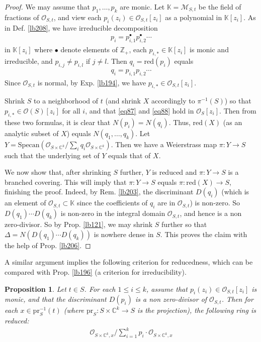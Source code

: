 \documentclass[12pt,b5paper,notitlepage]{report}
\theoremstyle{definition}
\theoremstyle{plain}
\newtheorem{pp}[df]{Proposition}
\newcommand{\scr}{\mathscr}
\newcommand{\blt}{\bullet}
\newcommand{\Kbb}{\mathbb K}
\newcommand{\Cbb}{\mathbb C}
\newcommand{\Zbb}{\mathbb Z}
\newcommand{\pr}{\mathrm {pr}}
\newcommand{\Specan}{\mathrm{Specan}}
\newcommand{\red}{\mathrm{red}}
\numberwithin{equation}{section}
\begin{document}
\begin{proof}
We may assume that $p_1,\dots,p_k$ are monic. Let $\Kbb=\scr M_{S,t}$ be the field of fractions of $\scr O_{S,t}$, and view each $p_i(z_i)\in\scr O_{S,t}[z_i]$ as a polynomial in $\Kbb[z_i]$. As in Def. \ref{lb208}, we have irreducible decomposition
\begin{align}
p_i=p_{i,1}^\blt p_{i,2}^\blt\cdots\label{eq87}
\end{align}
in $\Kbb[z_i]$ where $\blt$ denote elements of $\Zbb_+$, each $p_{i,*}\in\Kbb[z_i]$ is monic and irreducible, and $p_{i,j}\neq p_{i,l}$ if $j\neq l$. Then $q_i=\red(p_i)$ equals
\begin{align}
q_i=p_{i,1}p_{i,2}\cdots\label{eq88}
\end{align}
Since $\scr O_{S,t}$ is normal, by Exp. \ref{lb194}, we have $p_{i,*}\in\scr O_{S,t}[z_i]$. 

Shrink $S$ to a neighborhood of $t$ (and shrink $X$ accordingly to $\pi^{-1}(S)$) so that $p_{i,*}\in\scr O(S)[z_i]$ for all $i$, and that \eqref{eq87} and \eqref{eq88} hold in $\scr O_S[z_i]$. Then from these two formulas, it is clear that $N(p_i)=N(q_i)$. Thus, $\red(X)$ (as an analytic subset of $X$) equals $N(q_1,\dots,q_k)$. Let $Y=\Specan(\scr O_{S\times\Cbb^k}/\sum_i q_i\scr O_{S\times\Cbb^k})$. Then we have a Weierstrass map $\pi:Y\rightarrow S$ such that the underlying set of $Y$ equals that of $X$.

We now show that, after shrinking $S$ further, $Y$ is reduced and $\pi:Y\rightarrow S$ is a branched covering. This will imply that $\pi:Y\rightarrow S$ equals $\pi:\red(X)\rightarrow S$, finishing the proof. Indeed, by Rem. \ref{lb203}, the discriminant $D(q_i)$ (which is an element of $\scr O_{S,t}\subset\Kbb$ since the coefficients of $q_i$ are in $\scr O_{S,t}$) is non-zero. So $D(q_1)\cdots D(q_k)$ is non-zero in the integral domain $\scr O_{S,t}$, and hence is a non zero-divisor. So by Prop. \ref{lb121}, we may shrink $S$ further so that $\Delta=N(D(q_1)\cdots D(q_k))$ is nowhere dense in $S$. This proves the claim with the help of Prop. \ref{lb206}.
\end{proof}

A similar argument implies the following criterion for reducedness, which can be compared with Prop. \ref{lb196} (a criterion for irreducibility).

\begin{pp}\label{lb379}
Let $t\in S$. For each $1\leq i\leq k$, assume that $p_i(z_i)\in\scr O_{S,t}[z_i]$ is monic, and that the discriminant $D(p_i)$ is a non zero-divisor of $\scr O_{S,t}$. Then for each $x\in\pr_S^{-1}(t)$ (where $\pr_S:S\times\Cbb^k\rightarrow S$ is the projection), the following ring is reduced:
\begin{align*}
\scr O_{S\times\Cbb^k,x}\Big/ \sum_{i=1}^k p_i\cdot\scr O_{S\times\Cbb^k,x}
\end{align*}
\end{pp}
\end{document}
